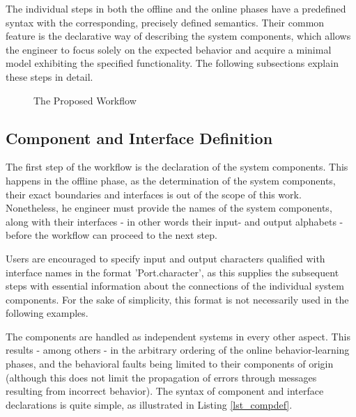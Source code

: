 The individual steps in both the offline and the online phases have a predefined syntax with the corresponding, precisely defined semantics. Their common feature is the declarative way of describing the system components, which allows the engineer to focus solely on the expected behavior and acquire a minimal model exhibiting the specified functionality. The following subsections explain these steps in detail.

\begin{figure}[!ht] 
	\centering
	\caption{The Proposed Workflow}
	\label{fig_methodology_workflow}
\end{figure}

\subsection{Component and Interface Definition} \label{subs_compdef}
The first step of the workflow is the declaration of the system components. This happens in the offline phase, as the determination of the system components, their exact boundaries and interfaces is out of the scope of this work. Nonetheless, he engineer must provide the names of the system components, along with their interfaces - in other words their input- and output alphabets - before the workflow can proceed to the next step.

Users are encouraged to specify input and output characters qualified with interface names in the format 'Port.character', as this supplies the subsequent steps with essential information about the connections of the individual system components. For the sake of simplicity, this format is not necessarily used in the following examples.

The components are handled as independent systems in every other aspect. This results - among others - in the arbitrary ordering of the online behavior-learning phases, and the behavioral faults being limited to their components of origin (although this does not limit the propagation of errors through messages resulting from incorrect behavior).
The syntax of component and interface declarations is quite simple, as illustrated in Listing \ref{lst_compdef}.

